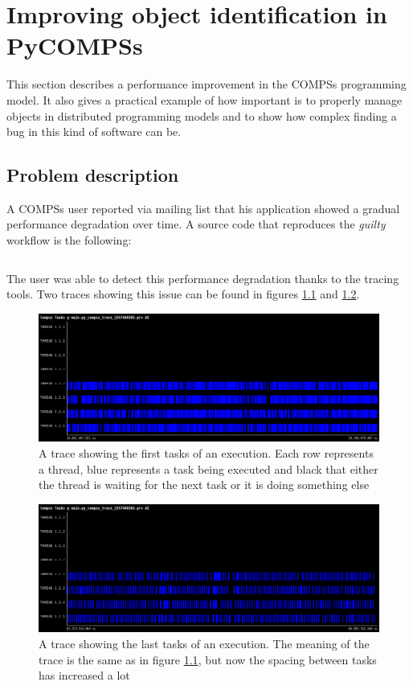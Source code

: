 \newpage
\chapter{Improving object identification in PyCOMPSs}
\label{sec:task_overhead}
This section describes a performance improvement in the COMPSs programming model. It also gives a practical example of how important is to properly manage objects in distributed programming models and to show how complex finding a bug in this kind of software can be.

\section{Problem description}
A COMPSs user reported via mailing list that his application showed a gradual performance degradation over time. A source code that reproduces the \textit{guilty} workflow is the following:

\inputminted{python}{applications/TASK_OVERHEAD/main.py}

The user was able to detect this performance degradation thanks to the tracing tools. Two traces showing this issue can be found in figures \ref{fig:zoom_task_early} and \ref{fig:zoom_task_late}.

\begin{figure}
\centering
\includegraphics[scale = 0.3]{figures/zoom_task_early.png}
\caption{A trace showing the first tasks of an execution. Each row represents a thread, blue represents a task being executed and black that either the thread is waiting for the next task or it is doing something else}
\label{fig:zoom_task_early}
\end{figure}

\begin{figure}
\centering
\includegraphics[scale = 0.3]{figures/zoom_task_late.png}
\caption{A trace showing the last tasks of an execution. The meaning of the trace is the same as in figure \ref{fig:zoom_task_early}, but now the spacing between tasks has increased a lot}
\label{fig:zoom_task_late}
\end{figure}

